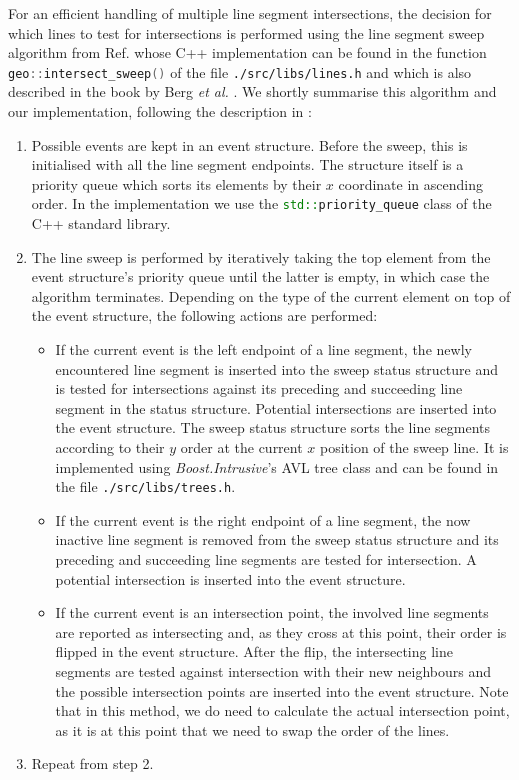 For an efficient handling of multiple line segment intersections, the decision for which lines to test for intersections is
performed using the line segment sweep algorithm from Ref. \cite[Ch. 2.3.2, pp. 69-80]{FUH_geo2020} whose C++ implementation can be
found in the function \lstinline[language=C++]|geo::intersect_sweep()| of the file \lstinline|./src/libs/lines.h| and which
is also described in the book by Berg \textit{et al.} \cite[Ch. 2, pp. 19-43]{Berg2008}.
We shortly summarise this algorithm and our implementation, following the description in \cite[Ch. 2.3.2, pp. 69-80]{FUH_geo2020}:
\begin{enumerate}
	\item Possible events are kept in an event structure. Before the sweep, this is initialised with all the line segment
		endpoints. The structure itself is a priority queue which sorts its elements by their $x$ coordinate in ascending order.
		In the implementation we use the \lstinline[language=C++]|std::priority_queue| class of the C++ standard library.
	\item The line sweep is performed by iteratively taking the top element from the event structure's priority queue until
		the latter is empty, in which case the algorithm terminates.
		Depending on the type of the current element on top of the event structure, the following actions are performed:
		\begin{itemize}
			\item If the current event is the left endpoint of a line segment, the newly encountered line segment is
				inserted into the sweep status structure and is tested for intersections against its preceding and succeeding
				line segment in the status structure. Potential intersections are inserted into the event structure.
				The sweep status structure sorts the line segments according to their $y$ order at the current $x$ position
				of the sweep line. It is implemented using \textit{Boost.Intrusive}'s \cite{web_boost_intrusive}
				AVL tree class \cite{web_boost_intrusive_avltree} and can be found in the file \lstinline|./src/libs/trees.h|.
			\item If the current event is the right endpoint of a line segment, the now inactive line segment is
				removed from the sweep status structure and its preceding and succeeding line segments are tested
				for intersection. A potential intersection is inserted into the event structure.
			\item If the current event is an intersection point, the involved line segments are reported as intersecting
				and, as they cross at this point, their order is flipped in the event structure.
				After the flip, the intersecting line segments are tested against intersection with their new neighbours
				and the possible intersection points are inserted into the event structure.
				Note that in this method, we do need to calculate the actual intersection point, as it is at this point
				that we need to swap the order of the lines.
		\end{itemize}
	\item Repeat from step 2.
\end{enumerate}


